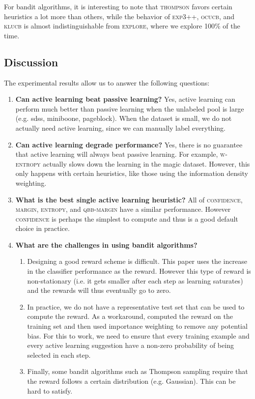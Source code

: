\documentclass[fleqn,10pt,lineno]{wlpeerj} %
\begin{document}
For bandit algorithms, it is interesting to note that \textsc{thompson}
favors certain heuristics a lot more than others, while the behavior of
\textsc{exp3++}, \textsc{ocucb}, and \textsc{klucb} is almost indistinguishable
from \textsc{explore}, where we explore 100\% of the time.

\subsection{Discussion}

The experimental results allow us to answer the following questions:

\begin{enumerate}
	\item \textbf{Can active learning beat passive learning?} Yes, active
	learning can perform much better than passive learning when the unlabeled
	pool is large (e.g. sdss, miniboone, pageblock). When the dataset is small,
	we do not actually need active learning, since we can manually label
	everything.

	\item \textbf{Can active learning degrade performance?} Yes, there is no
	guarantee that active learning will always beat passive learning. For
	example, \textsc{w-entropy} actually slows down the learning in the magic
	dataset. However, this only happens with certain heuristics, like those
	using the information density weighting.

	\item \textbf{What is the best single active learning heuristic?} All of
	\textsc{confidence}, \textsc{margin}, \textsc{entropy}, and
	\textsc{qbb-margin} have a similar performance. However \textsc{confidence}
	is perhaps the simplest to compute and thus is a good default choice in
	practice.

	\item \textbf{What are the challenges in using bandit algorithms?}
	\begin{enumerate}
		\item Designing a good reward scheme is difficult. This paper uses the
		increase in the classifier performance as the reward. However this type
		of reward is non-stationary (i.e. it gets smaller after each step as
		learning saturates) and the rewards will thus eventually go to zero.
		\item In practice, we do not have a representative test set that can be
		used to compute the reward. As a workaround, \cite{hsu15} computed the
		reward on the training set and then used importance weighting to remove
		any potential bias. For this to work, we need to ensure that every
		training example and every active learning suggestion have a non-zero
		probability of being selected in each step.
		\item Finally, some bandit algorithms such as Thompson sampling
		require that the reward follows a certain distribution (e.g. Gaussian).
		This can be hard to satisfy.
	\end{enumerate}


\end{enumerate}
\end{document}
